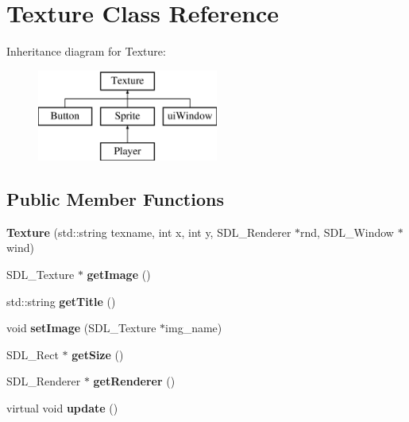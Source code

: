 \hypertarget{classTexture}{}\section{Texture Class Reference}
\label{classTexture}
Inheritance diagram for Texture\+:\begin{figure}[H]
\begin{center}
\leavevmode
\includegraphics[height=3.000000cm]{classTexture}
\end{center}
\end{figure}
\subsection*{Public Member Functions}
\begin{DoxyCompactItemize}
\item 
\hypertarget{classTexture_a12e9444b8f290a4b70f2afaf86107ad3}{}{\bfseries Texture} (std\+::string texname, int x, int y, S\+D\+L\+\_\+\+Renderer $\ast$rnd, S\+D\+L\+\_\+\+Window $\ast$wind)\label{classTexture_a12e9444b8f290a4b70f2afaf86107ad3}

\item 
\hypertarget{classTexture_aaaee3c61379b8bf4f2ef545eaa232f6a}{}S\+D\+L\+\_\+\+Texture $\ast$ {\bfseries get\+Image} ()\label{classTexture_aaaee3c61379b8bf4f2ef545eaa232f6a}

\item 
\hypertarget{classTexture_ac6ef519f59a0af5ae6004b09af3c7c80}{}std\+::string {\bfseries get\+Title} ()\label{classTexture_ac6ef519f59a0af5ae6004b09af3c7c80}

\item 
\hypertarget{classTexture_ac3b176c8ffb877bac93b769762843e94}{}void {\bfseries set\+Image} (S\+D\+L\+\_\+\+Texture $\ast$img\+\_\+name)\label{classTexture_ac3b176c8ffb877bac93b769762843e94}

\item 
\hypertarget{classTexture_a4fe73d77b591b9609011ccc69d613c81}{}S\+D\+L\+\_\+\+Rect $\ast$ {\bfseries get\+Size} ()\label{classTexture_a4fe73d77b591b9609011ccc69d613c81}

\item 
\hypertarget{classTexture_a457018a962cb9576ed1ab4c13680db8e}{}S\+D\+L\+\_\+\+Renderer $\ast$ {\bfseries get\+Renderer} ()\label{classTexture_a457018a962cb9576ed1ab4c13680db8e}

\item 
\hypertarget{classTexture_a83d747010b0955170ebcd63941e32c20}{}virtual void {\bfseries update} ()\label{classTexture_a83d747010b0955170ebcd63941e32c20}

\end{DoxyCompactItemize}
